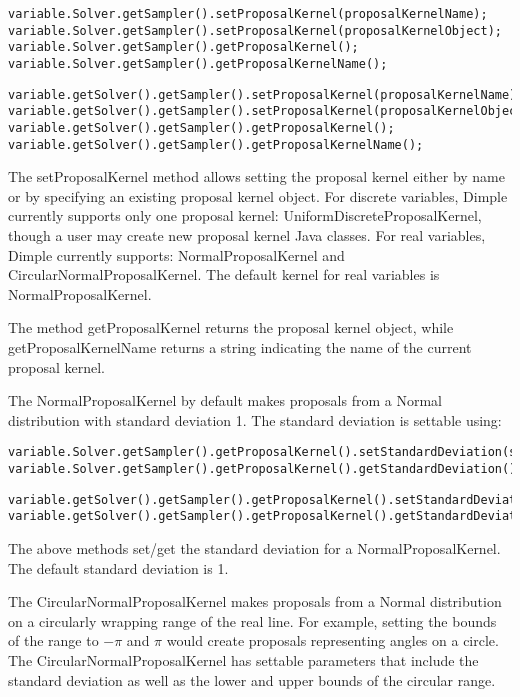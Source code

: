 \ifmatlab
\begin{lstlisting}
variable.Solver.getSampler().setProposalKernel(proposalKernelName);
variable.Solver.getSampler().setProposalKernel(proposalKernelObject);
variable.Solver.getSampler().getProposalKernel();
variable.Solver.getSampler().getProposalKernelName();
\end{lstlisting}
\fi

\ifjava
\begin{lstlisting}
variable.getSolver().getSampler().setProposalKernel(proposalKernelName);
variable.getSolver().getSampler().setProposalKernel(proposalKernelObject);
variable.getSolver().getSampler().getProposalKernel();
variable.getSolver().getSampler().getProposalKernelName();
\end{lstlisting}
\fi

The setProposalKernel method allows setting the proposal kernel either by name or by specifying an existing proposal kernel object.  For discrete variables, Dimple currently supports only one proposal kernel: UniformDiscreteProposalKernel, though a user may create new proposal kernel Java classes.  For real variables, Dimple currently supports: NormalProposalKernel and CircularNormalProposalKernel.  The default kernel for real variables is NormalProposalKernel.

The method getProposalKernel returns the proposal kernel object, while getProposalKernelName returns a string indicating the name of the current proposal kernel.

The NormalProposalKernel by default makes proposals from a Normal distribution with standard deviation 1.  The standard deviation is settable using:

\ifmatlab
\begin{lstlisting}
variable.Solver.getSampler().getProposalKernel().setStandardDeviation(std);
variable.Solver.getSampler().getProposalKernel().getStandardDeviation();
\end{lstlisting}
\fi

\ifjava
\begin{lstlisting}
variable.getSolver().getSampler().getProposalKernel().setStandardDeviation(std);
variable.getSolver().getSampler().getProposalKernel().getStandardDeviation();
\end{lstlisting}
\fi

The above methods set/get the standard deviation for a NormalProposalKernel.  The default standard deviation is 1.

The CircularNormalProposalKernel makes proposals from a Normal distribution on a circularly wrapping range of the real line.  For example, setting the bounds of the range to $-\pi$ and $\pi$ would create proposals representing angles on a circle.  The CircularNormalProposalKernel has settable parameters that include the standard deviation as well as the lower and upper bounds of the circular range.

